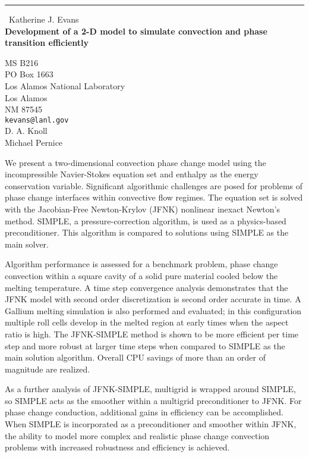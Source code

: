 \documentclass{report}
\begin{document}
\begin{center}
\rule{6in}{1pt} \
{\large Katherine J. Evans \\
{\bf Development of a 2-D model to simulate convection and phase transition efficiently}}

MS B216 \\ PO Box 1663 \\ Los Alamos National Laboratory \\ Los Alamos \\ NM 87545
\\
{\tt kevans@lanl.gov}\\
D. A. Knoll\\
Michael Pernice \end{center}

We present a two-dimensional convection phase change model using the
incompressible Navier-Stokes equation set and enthalpy as the energy
conservation variable. Significant algorithmic challenges are posed for
problems of phase change interfaces within convective flow regimes. The
equation set is solved with the Jacobian-Free Newton-Krylov (JFNK)
nonlinear inexact Newton's method. SIMPLE, a pressure-correction
algorithm, is used as a physics-based preconditioner. This algorithm is
compared to solutions using SIMPLE as the main solver.

Algorithm performance is assessed for a benchmark problem, phase change
convection within a square cavity of a solid pure material cooled below
the melting temperature. A time step convergence analysis demonstrates
that the JFNK model with second order discretization is second order
accurate in time. A Gallium melting simulation is also performed and
evaluated; in this configuration multiple roll cells develop in the
melted region at early times when the aspect ratio is high. The
JFNK-SIMPLE method is shown to be more efficient per time step and more
robust at larger
time steps when compared to SIMPLE as the main solution algorithm.
Overall CPU savings of more than an order of magnitude are realized.

As a further analysis of JFNK-SIMPLE, multigrid is wrapped around SIMPLE,
so SIMPLE acts as the smoother within a multigrid preconditioner to JFNK.
For phase change conduction, additional gains in efficiency can be
accomplished. When SIMPLE is incorporated as a preconditioner and
smoother within JFNK, the ability to model more
complex and realistic phase change convection problems with increased
robustness and efficiency is achieved.
\end{document}
